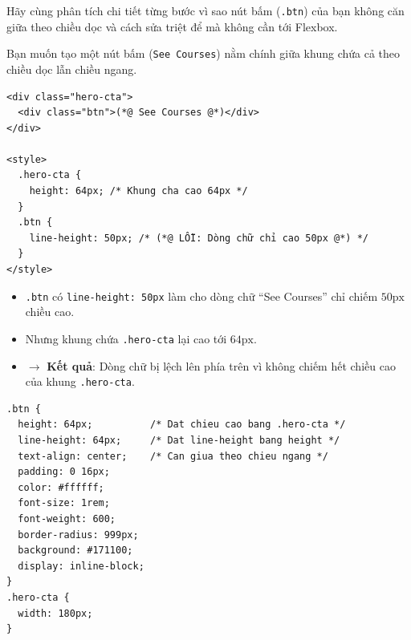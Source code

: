 \documentclass[11pt,oneside]{book}
\newcommand{\codeinline}[1]{\textcolor{accentOrange}{\texttt{#1}}}
\begin{document}
Hãy cùng phân tích chi tiết từng bước vì sao nút bấm (\codeinline{.btn}) của bạn không căn giữa theo chiều dọc và cách sửa triệt để mà không cần tới Flexbox.

\begin{conceptBox}
Bạn muốn tạo một nút bấm (\codeinline{See Courses}) nằm chính giữa khung chứa cả theo chiều dọc lẫn chiều ngang.
\end{conceptBox}

\begin{codeWindow}
\begin{lstlisting}[language=HTML5]
<div class="hero-cta">
  <div class="btn">(*@ See Courses @*)</div>
</div>

<style>
  .hero-cta {
    height: 64px; /* Khung cha cao 64px */
  }
  .btn {
    line-height: 50px; /* (*@ LỖI: Dòng chữ chỉ cao 50px @*) */
  }
</style>
\end{lstlisting}
\end{codeWindow}

\begin{warnBox}
\begin{itemize}[leftmargin=1.5em, itemsep=3pt, parsep=0pt]
    \item \codeinline{.btn} có \codeinline{line-height: 50px} làm cho dòng chữ ``See Courses'' chỉ chiếm $50\text{px}$ chiều cao.
    \item Nhưng khung chứa \codeinline{.hero-cta} lại cao tới $64\text{px}$.
    \item $\rightarrow$ \textbf{Kết quả}: Dòng chữ bị lệch lên phía trên vì không chiếm hết chiều cao của khung \codeinline{.hero-cta}.
\end{itemize}
\end{warnBox}

\begin{codeWindow}
\begin{lstlisting}[language=CSS3]
.btn {
  height: 64px;          /* Dat chieu cao bang .hero-cta */
  line-height: 64px;     /* Dat line-height bang height */
  text-align: center;    /* Can giua theo chieu ngang */
  padding: 0 16px;
  color: #ffffff;
  font-size: 1rem;
  font-weight: 600;
  border-radius: 999px;
  background: #171100;
  display: inline-block;
}
.hero-cta {
  width: 180px;
}
\end{lstlisting}
\end{codeWindow}
\end{document}

